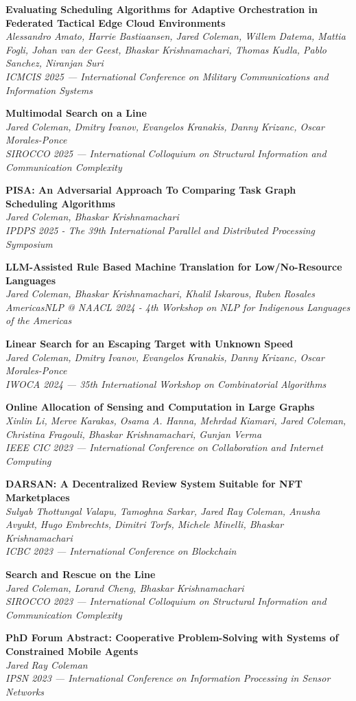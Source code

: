 \documentclass[letterpaper,11pt]{article}
\newcommand{\pub}[3]{
  \vspace{-1pt}\item \textbf{#1} \\ 
    \textit{\small#2} \\
    \textit{\small#3}\vspace{-5pt}
}
\begin{document}
    \pub
    {Evaluating Scheduling Algorithms for Adaptive Orchestration in Federated Tactical Edge Cloud Environments}
    {Alessandro Amato, Harrie Bastiaansen, Jared Coleman, Willem Datema, Mattia Fogli, Johan van der Geest, Bhaskar Krishnamachari, Thomas Kudla, Pablo Sanchez, Niranjan Suri}
    {ICMCIS 2025 --- International Conference on Military Communications and Information Systems}

    \pub
    {Multimodal Search on a Line}
    {Jared Coleman, Dmitry Ivanov, Evangelos Kranakis, Danny Krizanc, Oscar Morales-Ponce}
    {SIROCCO 2025 --- International Colloquium on Structural Information and Communication Complexity}

    \pub
    {PISA: An Adversarial Approach To Comparing Task Graph Scheduling Algorithms}
    {Jared Coleman, Bhaskar Krishnamachari}
    {IPDPS 2025 - The 39th International Parallel and Distributed Processing Symposium}

    \pub
    {LLM-Assisted Rule Based Machine Translation for Low/No-Resource Languages}
    {Jared Coleman, Bhaskar Krishnamachari, Khalil Iskarous, Ruben Rosales}
    {AmericasNLP @ NAACL 2024 - 4th Workshop on NLP for Indigenous Languages of the Americas}

    \pub
    {Linear Search for an Escaping Target with Unknown Speed}
    {Jared Coleman, Dmitry Ivanov, Evangelos Kranakis, Danny Krizanc, Oscar Morales-Ponce}
    {IWOCA 2024 --- 35th International Workshop on Combinatorial Algorithms}

    \pub
    {Online Allocation of Sensing and Computation in Large Graphs}
    {Xinlin Li, Merve Karakas, Osama A. Hanna, Mehrdad Kiamari, Jared Coleman, Christina Fragouli, Bhaskar Krishnamachari, Gunjan Verma}
    {IEEE CIC 2023 --- International Conference on Collaboration and Internet Computing}
    
    \pub
    {DARSAN: A Decentralized Review System Suitable for NFT Marketplaces}
    {Sulyab Thottungal Valapu, Tamoghna Sarkar, Jared Ray Coleman, Anusha Avyukt, Hugo Embrechts, Dimitri Torfs, Michele Minelli, Bhaskar Krishnamachari}
    {ICBC 2023 --- International Conference on Blockchain}

    \pub
    {Search and Rescue on the Line}
    {Jared Coleman, Lorand Cheng, Bhaskar Krishnamachari}
    {SIROCCO 2023 --- International Colloquium on Structural Information and Communication Complexity}

    \pub
    {PhD Forum Abstract: Cooperative Problem-Solving with Systems of Constrained Mobile Agents}
    {Jared Ray Coleman}
    {IPSN 2023 --- International Conference on Information Processing in Sensor Networks}
\end{document}
